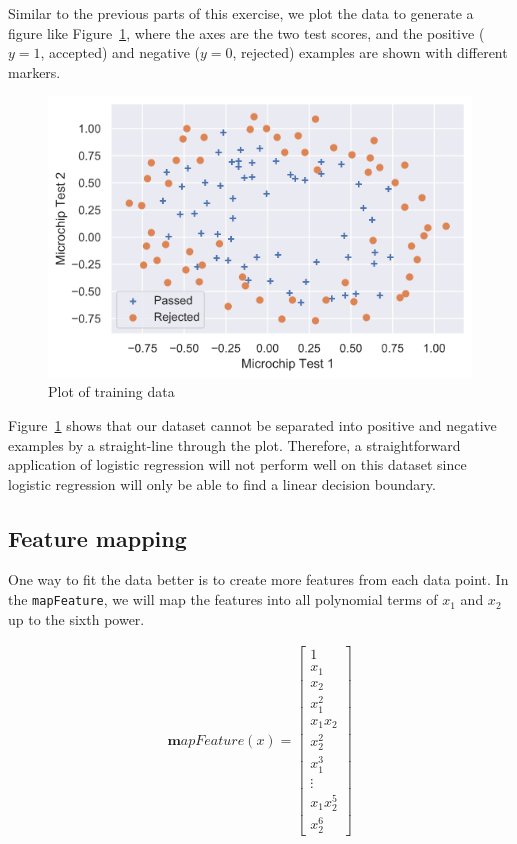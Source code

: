 \documentclass[12pt]{article}
\begin{document}
Similar to the previous parts of this exercise, we plot the data to generate a figure like Figure~\ref{fig:scatter1}, where the axes are the two test scores, and the positive ($y = 1$, accepted) and negative ($y = 0$, rejected) examples are shown with different markers.

\begin{figure}[h!]
  \centering
  \includegraphics[scale=0.6]{scatter1.png}
  \caption{Plot of training data}
  \label{fig:scatter1}
\end{figure}

Figure~\ref{fig:scatter1} shows that our dataset cannot be separated into positive and negative examples by a straight-line through the plot. Therefore, a straightforward application of logistic regression will not perform well on this dataset since logistic regression will only be able to find a linear decision boundary.


\subsection{Feature mapping}

One way to fit the data better is to create more features from each data point. In the \texttt{mapFeature}, we will map the features into all polynomial terms of $x_1$ and $x_2$ up to the sixth power.

\begin{align}
  \mathbf mapFeature(x) = \begin{bmatrix} 1 \\ x_1 \\ x_2 \\ x_1^2 \\ x_1x_2 \\ x_2^2 \\ x_1^3 \\ \vdots \\ x_1x_2^5 \\ x_2^6 \end{bmatrix}
\end{align}
\end{document}

